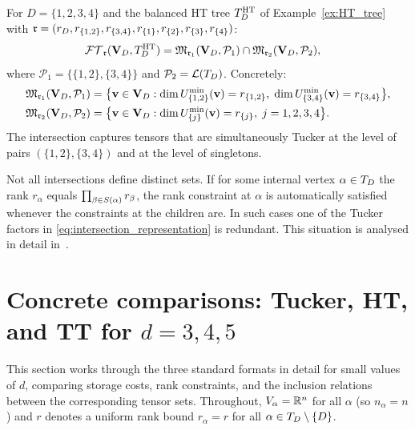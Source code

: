 \begin{example}
\label{ex:intersection_d4}
For $D = \{1,2,3,4\}$ and the balanced HT tree
$T_D^{\mathrm{HT}}$ of Example~\ref{ex:HT_tree} with
$\mathfrak{r} = (r_D, r_{\{1,2\}}, r_{\{3,4\}}, r_{\{1\}}, r_{\{2\}},
r_{\{3\}}, r_{\{4\}})$:
\begin{align*}
    \mathcal{FT}_{\mathfrak{r}}(\mathbf{V}_D,T_D^{\mathrm{HT}})
    &= \mathfrak{M}_{\mathfrak{r}_1}(\mathbf{V}_D, \mathcal{P}_1)
     \cap \mathfrak{M}_{\mathfrak{r}_2}(\mathbf{V}_D, \mathcal{P}_2),
\end{align*}
where $\mathcal{P}_1 = \{\{1,2\},\{3,4\}\}$ and
$\mathcal{P}_2 = \mathcal{L}(T_D)$.
Concretely:
\begin{align*}
    \mathfrak{M}_{\mathfrak{r}_1}(\mathbf{V}_D, \mathcal{P}_1)
    &= \bigl\{\mathbf{v} \in \mathbf{V}_D :
        \dim U^{\min}_{\{1,2\}}(\mathbf{v}) = r_{\{1,2\}},\;
        \dim U^{\min}_{\{3,4\}}(\mathbf{v}) = r_{\{3,4\}}\bigr\}, \\
    \mathfrak{M}_{\mathfrak{r}_2}(\mathbf{V}_D, \mathcal{P}_2)
    &= \bigl\{\mathbf{v} \in \mathbf{V}_D :
        \dim U^{\min}_{\{j\}}(\mathbf{v}) = r_{\{j\}},\; j=1,2,3,4\bigr\}.
\end{align*}
The intersection captures tensors that are simultaneously Tucker
at the level of pairs $(\{1,2\},\{3,4\})$ and at the level of
singletons.
\end{example}

\begin{remark}
\label{rem:degenerate}
Not all intersections define distinct sets. If for some internal
vertex $\alpha \in T_D$ the rank $r_\alpha$ equals
$\prod_{\beta \in S(\alpha)} r_\beta$, the rank constraint at
$\alpha$ is automatically satisfied whenever the constraints at
the children are. In such cases one of the Tucker factors in
\eqref{eq:intersection_representation} is redundant.
This situation is analysed in detail in~\cite[Theorem~3.12]{FHN2023}.
\end{remark}

\section{Concrete comparisons: Tucker, HT, and TT for $d=3,4,5$}
\label{sec:trees:comparison}

This section works through the three standard formats in detail for
small values of $d$, comparing storage costs, rank constraints, and
the inclusion relations between the corresponding tensor sets.
Throughout, $V_\alpha = \mathbb{R}^n$ for all $\alpha$ (so $n_\alpha = n$)
and $r$ denotes a uniform rank bound $r_\alpha = r$ for all
$\alpha \in T_D \setminus \{D\}$.

